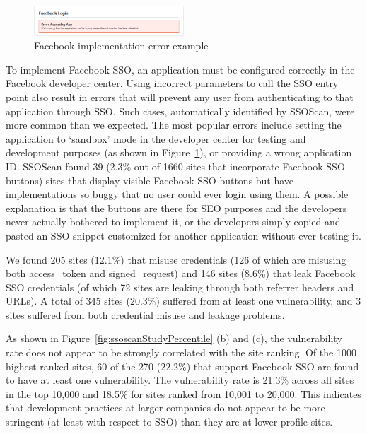 \begin{figure}[bth]
\centering
\includegraphics[width=0.5\textwidth]{figures/chapter4/ssoscanStudyFBError.png}
\caption{Facebook implementation error example}
\label{fig:ssoscanStudyFBError}
\end{figure}

 To implement Facebook SSO, an application must be configured correctly in the Facebook developer center.  Using incorrect parameters to call the SSO entry point also result in errors that will prevent any user from authenticating to that application through SSO.  Such cases, automatically identified by SSOScan, were more common than we expected.  The most popular errors include setting the application to `sandbox' mode in the developer center for testing and development purposes (as shown in Figure~\ref{fig:ssoscanStudyFBError}), or providing a wrong application ID.  SSOScan found 39 (2.3\% out of 1660 sites that incorporate Facebook SSO buttons) sites that display visible Facebook SSO buttons but have implementations so buggy that no user could ever login using them.  A possible explanation is that the buttons are there for SEO purposes and the developers never actually bothered to implement it, or the developers simply copied and pasted an SSO snippet customized for another application without ever testing it.

 We found 205 sites (12.1\%) that misuse credentials (126 of which are misusing both access\_token and signed\_request) and 146 sites (8.6\%) that leak Facebook SSO credentials (of which 72 sites are leaking through both referrer headers and URLs).  A total of 345 sites (20.3\%) suffered from at least one vulnerability, and 3 sites suffered from both credential misuse and leakage problems.

As shown in Figure~\ref{fig:ssoscanStudyPercentile} (b) and (c), the vulnerability rate does not appear to be strongly correlated with the site ranking.  Of the 1000 highest-ranked sites, 60 of the 270 (22.2\%) that support Facebook SSO are found to have at least one vulnerability.  The vulnerability rate is 21.3\% across all sites in the top 10,000 and 18.5\% for sites ranked from 10,001 to 20,000.  This indicates that development practices at larger companies do not appear to be more stringent (at least with respect to SSO) than they are at lower-profile sites.

